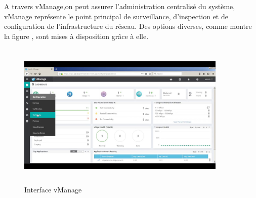 A travers vManage,on peut assurer l’administration centralisé du système, vManage représente le point principal de surveillance, d'inspection et de configuration de l'infrastructure du réseau. Des options diverses, comme montre la figure , sont mises à disposition grâce à elle.
\begin{figure} [H]
	\begin{center}
		\centering
		\hspace*{-0.5cm}
		\includegraphics[height=7cm,width=10cm]{../image/Vmanage}
	\end{center}
	\caption{Interface vManage}
\end{figure} 
